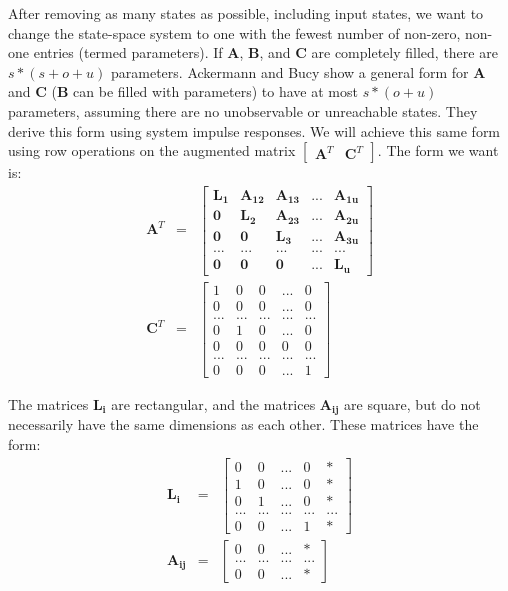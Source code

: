     After removing as many states as possible, including input
states, we want to change the state-space system to one with the
fewest number of non-zero, non-one entries (termed parameters). If
$\mathbf{A}$, $\mathbf{B}$, and $\mathbf{C}$ are completely
filled, there are $s*(s+o+u)$ parameters. Ackermann and Bucy
\cite{Ackermann/Bucy} show a general form for $\mathbf{A}$ and
$\mathbf{C}$ ($\mathbf{B}$ can be filled with parameters) to have
at most $s*(o+u)$ parameters, assuming there are no unobservable
or unreachable states. They derive this form using system impulse
responses. We will achieve this same form using row operations on
the augmented matrix $\left [
\begin{array} {cc} \mathbf{A}^T & \mathbf{C}^T \end{array} \right
]$. The form we want is:
\begin{eqnarray*}
\mathbf{A}^T & = & \left [ \begin{array} {ccccc} \mathbf{L_1} &
\mathbf{A_{12}} & \mathbf{A_{13}} & ... & \mathbf{A_{1u}} \\
\mathbf{0} & \mathbf{L_2} & \mathbf{A_{23}} & ... &
\mathbf{A_{2u}} \\ \mathbf{0} & \mathbf{0} & \mathbf{L_3} & ... &
\mathbf{A_{3u}} \\ ... & ... & ... & ... & ... \\ \mathbf{0} &
\mathbf{0} & \mathbf{0} & ... & \mathbf{L_u} \end{array} \right ] \\
\mathbf{C}^T & = & \left [ \begin{array} {ccccc} 1 & 0 & 0 & ... &
0 \\ 0 & 0 & 0 & ... & 0 \\ ... & ... & ... & ... & ... \\ 0 & 1 &
0 & ... & 0 \\ 0 & 0 & 0 & 0 & 0 \\ ... & ... & ... & ... & ... \\
0 & 0 & 0 & ... & 1 \end{array} \right ]
\end{eqnarray*}

    The matrices $\mathbf{L_i}$ are rectangular, and the matrices
$\mathbf{A_{ij}}$ are square, but do not necessarily have the same
dimensions as each other. These matrices have the form:
\begin{eqnarray*}
\mathbf{L_i} & = & \left [ \begin{array} {ccccc} 0 & 0 & ...
& 0 & * \\ 1 & 0 & ... & 0 & * \\ 0 & 1 & ... & 0 & * \\
... & ... & ... & ... & ... \\ 0 & 0 & ... & 1 & * \end{array}
\right ] \\
\mathbf{A_{ij}} & = & \left [ \begin{array} {cccc} 0 & 0 & ... & *
\\ ... & ... & ... & ... \\ 0 & 0 & ... & * \end{array} \right ]
\end{eqnarray*}

